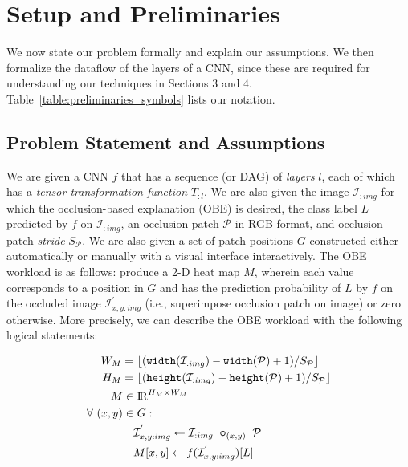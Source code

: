 \vspace{-1mm}
\section{Setup and Preliminaries}\label{sec:preliminaries}
We now state our problem formally and explain our assumptions.
We then formalize the dataflow of the layers of a CNN, since these are required for understanding our techniques in Sections 3 and 4.
Table~\ref{table:preliminaries_symbols} lists our notation.

\vspace{-2mm}
\subsection{Problem Statement and Assumptions}\label{sec:problem}

We are given a CNN $f$ that has a sequence (or DAG) of \textit{layers} $l$, each of which has a \textit{tensor transformation function} $T_{:l}$. We are also given the image $\mathcal{I}_{:img}$ for which the occlusion-based explanation (OBE) is desired, the class label $L$ predicted by $f$ on $\mathcal{I}_{:img}$, an occlusion patch $\mathcal{P}$ in RGB format, and occlusion patch \textit{stride} $S_{\mathcal{P}}$. We are also given a set of patch positions $G$ constructed either automatically or manually with a visual interface interactively. The OBE workload is as follows: produce a 2-D heat map $M$, wherein each value corresponds to a position in $G$ and has the prediction probability of $L$ by $f$ on the occluded image $\mathcal{I}^{'}_{x,y:img}$ (i.e., superimpose occlusion patch on image) or zero otherwise.
More precisely, we can describe the OBE workload with the following logical statements:

\vspace{-7mm}
\begin{align}
\label{eqn:mheight}
W_M =&~ \lfloor(\texttt{width}(\mathcal{I}_{:img}) - \texttt{width}(\mathcal{P}) + 1)/S_\mathcal{P}\rfloor\\
\label{eqn:mwidth}
H_M =&~ \lfloor(\texttt{height}(\mathcal{I}_{:img}) - \texttt{height}(\mathcal{P}) + 1)/S_\mathcal{P}\rfloor\\
M \in&~ \mathcal{\rm I\!R}^{H_M \times W_M}\\
\forall~ (x,y) \in&~ G:\\
\label{eqn:patchimpose}
& \mathcal{I}^{'}_{x,y:img} \leftarrow \mathcal{I}_{:img} ~ \bm\circ_{(x,y)} ~ \mathcal{P} \\
\label{eqn:outputval}
& M[x,y] \leftarrow f(\mathcal{I}^{'}_{x,y:img})[L]
\vspace{-5mm}
\end{align}

